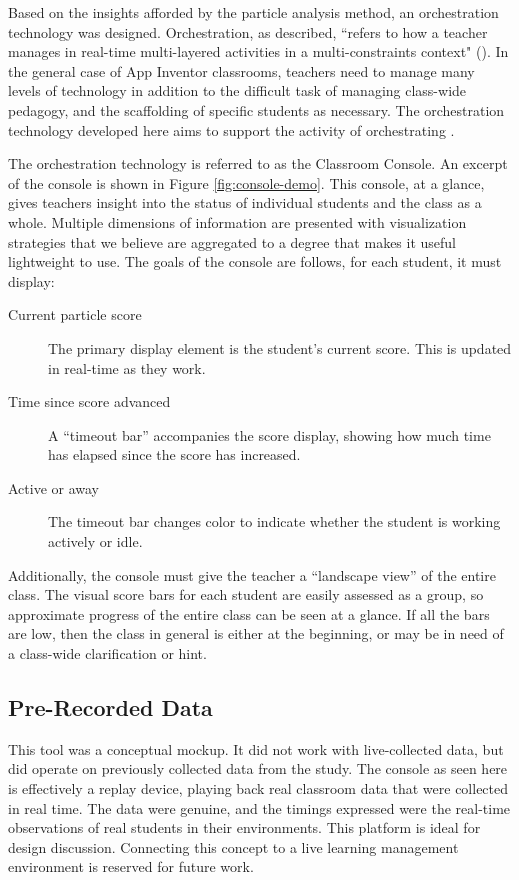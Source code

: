 Based on the insights afforded by the particle analysis method, an orchestration technology was designed. Orchestration, as \citeauthor{dillenbourg2012design} described, ``refers to how a teacher manages in real-time multi-layered activities in a multi-constraints context" (\citeyear{dillenbourg2012design}). In the general case of App Inventor classrooms, teachers need to manage many levels of technology in addition to the difficult task of managing class-wide pedagogy, and the scaffolding of specific students as necessary. The orchestration technology developed here aims to support the activity of orchestrating \citep{tchounikine2013clarifying}.

The orchestration technology is referred to as the Classroom Console. An excerpt of the console is shown in Figure \ref{fig:console-demo}. This console, at a glance, gives teachers insight into the status of individual students and the class as a whole. Multiple dimensions of information are presented with visualization strategies that we believe are aggregated to a degree that makes it useful lightweight to use. The goals of the console are follows, for each student, it must display:

\begin{description}
\item [Current particle score] The primary display element is the student's current score. This is updated in real-time as they work.
\item [Time since score advanced] A ``timeout bar'' accompanies the score display, showing how much time has elapsed since the score has increased.
\item [Active or away] The timeout bar changes color to indicate whether the student is working actively or idle.
\end{description}

Additionally, the console must give the teacher a ``landscape view'' of the entire class. The visual score bars for each student are easily assessed as a group, so approximate progress of the entire class can be seen at a glance. If all the bars are low, then the class in general is either at the beginning, or may be in need of a class-wide clarification or hint. 

\subsection{Pre-Recorded Data}
This tool was a conceptual mockup. It did not work with live-collected data, but did operate on previously collected data from the study. The console as seen here is effectively a replay device, playing back real classroom data that were collected in real time. The data were genuine, and the timings expressed were the real-time observations of real students in their environments. This platform is ideal for design discussion. Connecting this concept to a live learning management environment is reserved for future work. 

